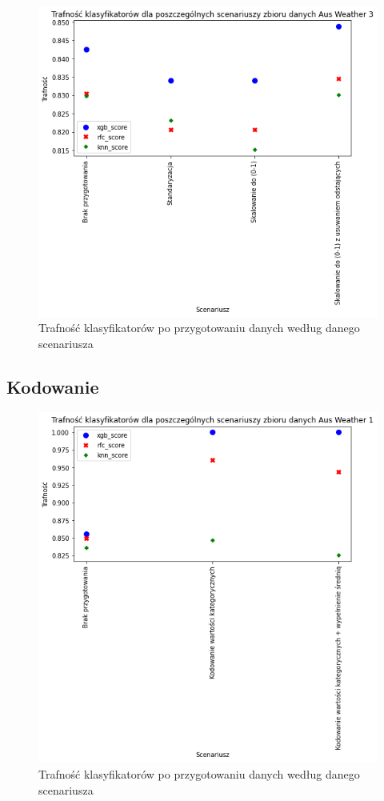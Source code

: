 \documentclass{book}
\begin{document}
\begin{figure}[H]
\centerline{\includegraphics{Aus_Weather_3_Standaryzacja}}
\centering
\caption{Trafność klasyfikatorów po przygotowaniu danych 
według danego scenariusza}
\end{figure}

\subsection{Kodowanie}


\begin{figure}[H]
\centerline{\includegraphics{Aus_Weather_1_Kodowanie}}
\centering
\caption{Trafność klasyfikatorów po przygotowaniu danych 
według danego scenariusza}
\end{figure}
\end{document}
